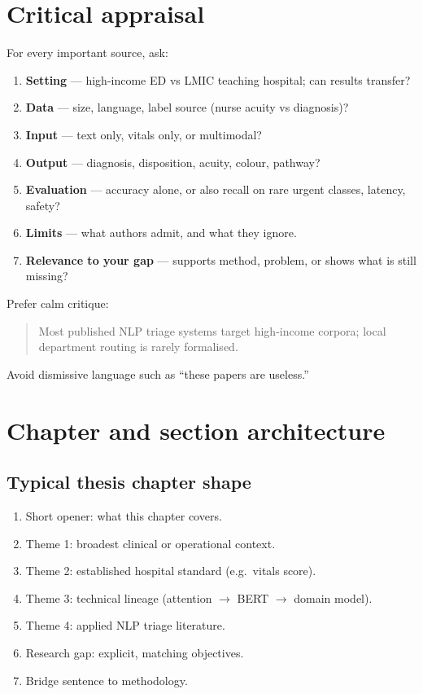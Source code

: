\documentclass[11pt,a4paper]{article}
\begin{document}
\section{Critical appraisal}

For every important source, ask:
\begin{enumerate}
  \item \textbf{Setting} --- high-income ED vs LMIC teaching hospital; can results transfer?
  \item \textbf{Data} --- size, language, label source (nurse acuity vs diagnosis)?
  \item \textbf{Input} --- text only, vitals only, or multimodal?
  \item \textbf{Output} --- diagnosis, disposition, acuity, colour, pathway?
  \item \textbf{Evaluation} --- accuracy alone, or also recall on rare urgent classes, latency, safety?
  \item \textbf{Limits} --- what authors admit, and what they ignore.
  \item \textbf{Relevance to your gap} --- supports method, problem, or shows what is still missing?
\end{enumerate}

Prefer calm critique:
\begin{quote}
Most published NLP triage systems target high-income corpora; local department routing is rarely formalised.
\end{quote}
Avoid dismissive language such as ``these papers are useless.''

\section{Chapter and section architecture}

\subsection{Typical thesis chapter shape}
\begin{enumerate}
  \item Short opener: what this chapter covers.
  \item Theme 1: broadest clinical or operational context.
  \item Theme 2: established hospital standard (e.g.\ vitals score).
  \item Theme 3: technical lineage (attention \(\to\) BERT \(\to\) domain model).
  \item Theme 4: applied NLP triage literature.
  \item Research gap: explicit, matching objectives.
  \item Bridge sentence to methodology.
\end{enumerate}
\end{document}
